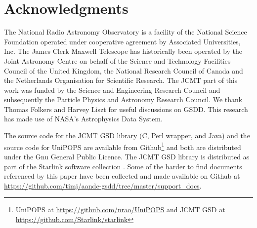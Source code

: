 \documentclass[final,authoryear,5p,times,twocolumn]{elsarticle}
\newcommand{\ascl}[1]{\href{http://www.ascl.net/#1}{ascl:#1}}
\begin{document}
\section*{Acknowledgments}

The National Radio Astronomy Observatory is a facility of the National
Science Foundation operated under cooperative agreement by Associated
Universities, Inc.
The James Clerk Maxwell Telescope has historically been operated by
the Joint Astronomy Centre on behalf of the Science and Technology
Facilities Council of the United Kingdom, the National Research
Council of Canada and the Netherlands Organisation for Scientific
Research. The JCMT part of this work was funded by the Science and
Engineering Research Council and subsequently the Particle Physics and
Astronomy Research Council.
We thank Thomas Folkers and Harvey Liszt for useful
discussions on GSDD. This research has made use of NASA's Astrophysics
Data System.

The source code for the JCMT GSD library (C, Perl wrapper, and Java)
and the source code for UniPOPS are available from
Github\footnote{UniPOPS at \url{https://github.com/nrao/UniPOPS} and JCMT
  GSD at \url{https://github.com/Starlink/starlink}}
and both are distributed under the Gnu General Public Licence. The
JCMT GSD library is distributed as part of the Starlink software
collection \citep[see e.g.,][\ascl{1110.012}]{2014ASPC..485..391C}.
Some of the harder to find documents referenced by this paper have
been collected and made available on Github at
\url{https://github.com/timj/aandc-gsdd/tree/master/support_docs}.
\end{document}
